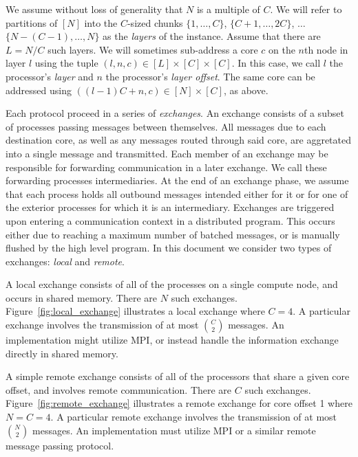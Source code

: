 \documentclass{report}
\begin{document}
We assume without loss of generality that $N$ is a multiple of $C$. 
We will refer to partitions of $[N]$ into the $C$-sized chunks $\{1, \dots, C\}$, $\{C+1, \dots, 2C\}$, $\dots$ $\{N-(C-1), \dots, N\}$ as the \emph{layers} of the instance.
Assume that there are $L = N/C$ such layers.
We will sometimes sub-address a core $c$ on the $n$th node in layer $l$ using the tuple $(l, n, c) \in [L] \times [C] \times [C]$.
In this case, we call $l$ the processor's \emph{layer} and $n$ the processor's \emph{layer offset}. 
The same core can be addressed using $((l-1)C + n, c) \in [N] \times [C]$, as above.

Each protocol proceed in a series of \emph{exchanges}.
An exchange consists of a subset of processes passing messages between themselves.
All messages due to each destination core, as well as any messages routed through said core, are aggretated into a single message and transmitted.
Each member of an exchange may be responsible for forwarding communication in a later exchange.
We call these forwarding processes intermediaries.
At the end of an exchange phase, we assume that each process holds all outbound messages intended either for it or for one of the exterior processes for which it is an intermediary.
Exchanges are triggered upon entering a communication context in a distributed program.
This occurs either due to reaching a maximum number of batched messages, or is manually flushed by the high level program.
In this document we consider two types of exchanges: \emph{local} and \emph{remote}.

A local exchange consists of all of the processes on a single compute node, and occurs in shared memory. 
There are $N$ such exchanges.
Figure~\ref{fig:local_exchange} illustrates a local exchange where $C=4$.
A particular exchange involves the transmission of at most ${C \choose 2}$ messages.
An implementation might utilize MPI, or instead handle the information exchange directly in shared memory.

A simple remote exchange consists of all of the processors that share a given core offset, and involves remote communication.
There are $C$ such exchanges.
Figure~\ref{fig:remote_exchange} illustrates a remote exchange for core offset 1 where $N = C = 4$.
A particular remote exchange involves the transmission of at most ${N \choose 2}$ messages.
An implementation must utilize MPI or a similar remote message passing protocol.

\end{document}
